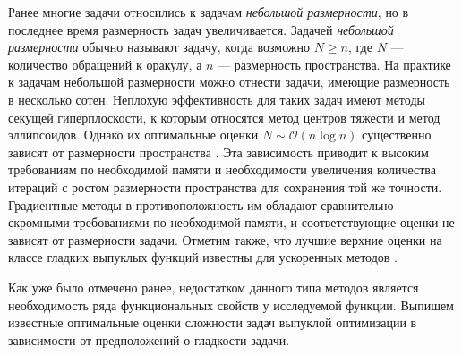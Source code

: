 Ранее многие задачи относились к задачам \textit{небольшой размерности}, но в последнее время размерность задач увеличивается. Задачей \textit{небольшой размерности} обычно называют задачу, когда возможно $N \geq n$, где $N$ --- количество обращений к оракулу, а $n$ --- размерность пространства. На практике к задачам небольшой размерности можно отнести задачи, имеющие размерность в несколько сотен. Неплохую эффективность для таких задач имеют методы секущей гиперплоскости, к которым относятся метод центров тяжести и метод эллипсоидов. Однако их оптимальные оценки $N \sim \mathcal{O}\left(n \log{n}\right)$ существенно зависят от размерности пространства \cite{bubeck_2015}. 
Эта зависимость приводит к высоким требованиям по необходимой памяти и необходимости увеличения количества итераций с ростом размерности пространства для сохранения той же точности. Градиентные методы в противоположность им обладают сравнительно скромными требованиями по необходимой памяти, и соответствующие оценки не зависят от размерности задачи. Отметим также, что лучшие верхние оценки на классе гладких выпуклых функций известны для ускоренных методов \cite{Nesterov1983}.

Как уже было отмечено ранее, недостатком данного типа методов является необходимость ряда функциональных свойств у исследуемой функции. Выпишем известные оптимальные оценки сложности задач выпуклой оптимизации в зависимости от предположений о гладкости задачи.

